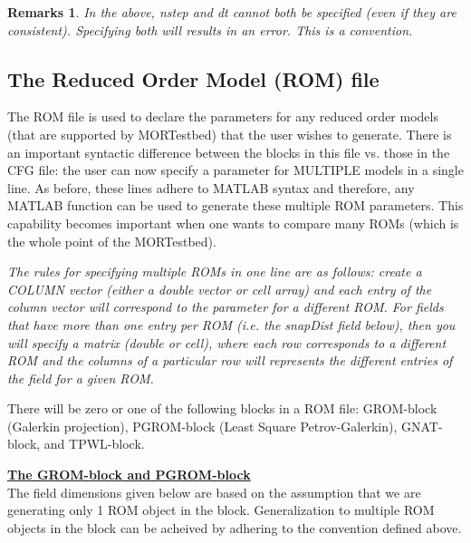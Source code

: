 \documentclass[notitlepage]{report}
\newtheorem*{Rem}{Remarks}
\begin{document}
\begin{Rem}
  In the above, nstep and dt cannot both be specified (even if they are consistent).  Specifying both will results in an error.  This is a convention.
\end{Rem}

\subsection{The Reduced Order Model (ROM) file}
The ROM file is used to declare the parameters for any reduced order models (that are supported by MORTestbed) that the user wishes to generate.  There is an important syntactic difference between the blocks in this file vs. those in the CFG file: the user can now specify a parameter for MULTIPLE models in a single line.  As before, these lines adhere to MATLAB syntax and therefore, any MATLAB function can be used to generate these multiple ROM parameters.  This capability becomes important when one wants to compare many ROMs (which is the whole point of the MORTestbed).

\emph{The rules for specifying multiple ROMs in one line are as follows: create a COLUMN vector (either a double vector or cell array) and each entry of the column vector will correspond to the parameter for a different ROM.  For fields that have more than one entry per ROM (i.e. the snapDist field below), then you will specify a matrix (double or cell), where each row corresponds to a different ROM and the columns of a particular row will represents the different entries of the field for a given ROM.}

There will be zero or one of the following blocks in a ROM file: GROM-block (Galerkin projection), PGROM-block (Least Square Petrov-Galerkin), GNAT-block, and TPWL-block.

\vspace{2mm}
\noindent \underline{\textbf{The GROM-block and PGROM-block}} \\
The field dimensions given below are based on the assumption that we are generating only 1 ROM object in the block.  Generalization to multiple ROM objects in the block can be acheived by adhering to the convention defined above.
\end{document}
